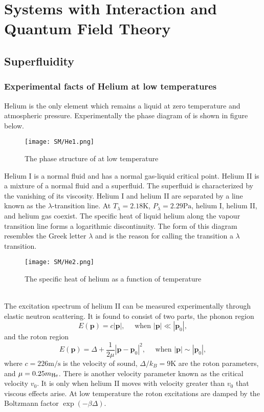 \chapter{Systems with Interaction and Quantum Field Theory}
\section{Superfluidity}
\subsection{Experimental facts of Helium at low temperatures}
Helium is the only element which remains a liquid at zero temperature and atmospheric pressure.
Experimentally the phase diagram of  is shown in figure below.
\begin{figure}[!h]
\centering
\texttt{[image: SM/He1.png]}
\caption{The phase structure of  at low temperature}
\end{figure}
Helium I is a normal fluid and has a normal gas-liquid critical point. Helium II is a mixture of a normal fluid and a superfluid. 
The superfluid is characterized by the vanishing of its viscosity. Helium I and helium II are separated by a line known as the $\lambda$-transition line.  At $T_{\lambda} = 2.18\mathrm{K}$, $P_{\lambda} = 2.29\mathrm{Pa}$, helium I, helium II, and helium gas coexist. 
The specific heat of liquid helium along the vapour transition line forms a logarithmic discontinuity. The form of this diagram resembles the Greek letter $\lambda$ and is the reason for calling the transition a $\lambda$ transition.
\begin{figure}[!h]
\centering
\texttt{[image: SM/He2.png]}
\caption{The specific heat of helium as a function of temperature}
\end{figure}
\\
The excitation spectrum of helium II can be measured experimentally through elastic neutron scattering. It is found to consist of two parts, the phonon region
\[E(\bm{p}) = c|\bm{p}| , \quad \mbox{ when } |\bm{p}| \ll |\bm{p}_0|,\]
and the roton region
\[E(\bm{p}) = \Delta + \frac{1}{2\mu} |\bm{p} - \bm{p}_0|^2 , \quad \mbox{ when } |\bm{p}| \sim |\bm{p}_0|,\]
where $c = 226 \mathrm{m/s}$ is the velocity of sound, $\Delta/k_B = 9\mathrm{K}$ are the roton parameters, and $\mu = 0.25m_{\rm He}$. 
There is another velocity parameter known as the critical velocity $v_0$. It is only when helium II moves with velocity greater than $v_0$ that viscous effects arise. At low temperature the roton excitations are damped by the Boltzmann factor $\exp(-\beta \Delta)$.

